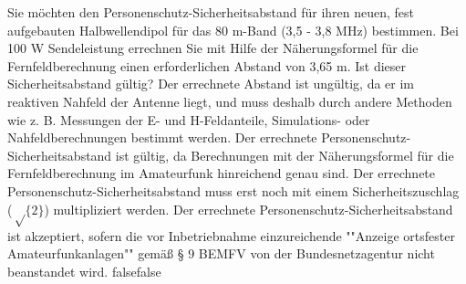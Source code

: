     {Sie möchten den Personenschutz-Sicherheitsabstand für ihren neuen, fest aufgebauten Halbwellendipol für das 80 m-Band (3,5 - 3,8 MHz) bestimmen. Bei 100 W Sendeleistung errechnen Sie mit Hilfe der Näherungsformel für die Fernfeldberechnung einen erforderlichen Abstand von 3,65 m. Ist dieser Sicherheitsabstand gültig?}
    {Der errechnete Abstand ist ungültig, da er im reaktiven Nahfeld der Antenne liegt, und muss deshalb durch andere Methoden wie z. B. Messungen der E- und H-Feldanteile, Simulations- oder Nahfeldberechnungen bestimmt werden.}
    {Der errechnete Personenschutz-Sicherheitsabstand ist gültig, da Berechnungen mit der Näherungsformel für die Fernfeldberechnung im Amateurfunk hinreichend genau sind.}
    {Der errechnete Personenschutz-Sicherheitsabstand muss erst noch mit einem Sicherheitszuschlag ($\sqrt\{2\}$) multipliziert werden.}
    {Der errechnete Personenschutz-Sicherheitsabstand ist akzeptiert, sofern die vor Inbetriebnahme einzureichende ""Anzeige ortsfester Amateurfunkanlagen"" gemäß § 9 BEMFV von der Bundesnetzagentur nicht beanstandet wird.}
    {false}{false}